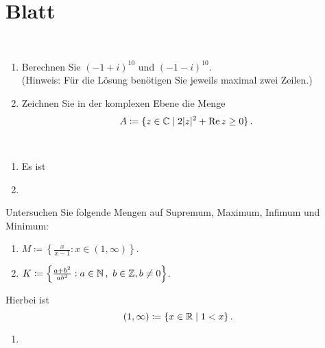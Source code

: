 \section{Blatt}

\begin{aufg}[6 Punkte]\mbox{ }
\begin{enumerate}[label=$\mathrm{(\roman*)}$, ref=$\mathrm{\roman*}$]
\item Berechnen Sie $\left(-1+i \right)^{10}$ und $\left(-1-i \right)^{10}$. \\
(Hinweis: F\"ur die L\"osung ben\"otigen Sie jeweils maximal zwei Zeilen.)
\item Zeichnen Sie in der komplexen Ebene die Menge
\[
 A \coloneqq \{ z\in\mathbb{C} \mid 2|z|^2 + \operatorname{Re} z \geq 0\}\,.
\]
\end{enumerate}
\end{aufg}

\bigskip

\begin{lsg}\mbox{ }
\begin{enumerate}[label=$\mathrm{(\roman*)}$, ref=$\mathrm{\roman*}$]
\item Es ist
%
\item 
\end{enumerate}
\end{lsg}

\bigskip

\begin{aufg}[6 Punkte]
Untersuchen Sie folgende Mengen auf Supremum, Maximum, Infimum und Minimum:
\begin{enumerate}[label=$\mathrm{(\roman*)}$, ref=$\mathrm{\roman*}$]
\item $M\coloneqq \left\{ \frac{x}{x-1} : x\in (1,\infty) \right\}$.
\item $K\coloneqq \left\{ \frac{a+b^2}{ab^2} : a\in\mathbb{N}\,,\ b\in\mathbb{Z}, b\not=0\right\}$.
\end{enumerate}
Hierbei ist 
\[
 (1,\infty) \coloneqq \{ x\in \mathbb{R} \mid 1<x \}\,.
\]
\end{aufg}
 
\bigskip

\begin{lsg}
\begin{enumerate}[label=$\mathrm{(\roman*)}$, ref=$\mathrm{\roman*}$]
\item 
\end{enumerate}
\end{lsg}


\bigskip


